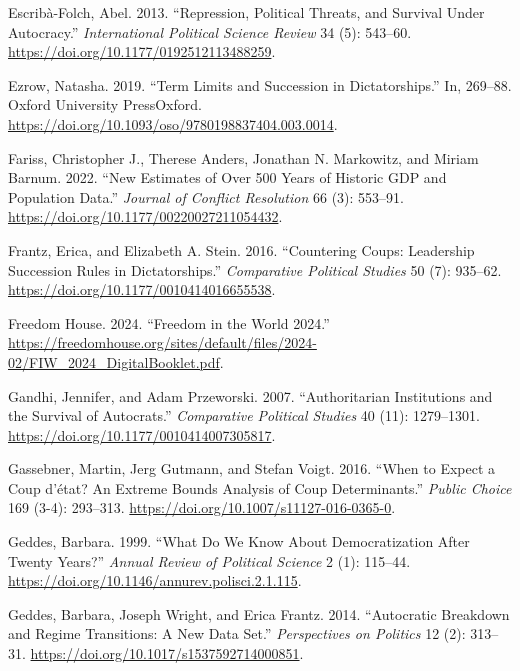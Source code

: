 \documentclass[
  12pt,
]{report}
\newlength{\cslhangindent}
\newenvironment{CSLReferences}[2] %
 {\begin{list}{}{%
  \setlength{\itemindent}{0pt}
  \setlength{\leftmargin}{0pt}
  \setlength{\parsep}{0pt}
  \ifodd #1
   \setlength{\leftmargin}{\cslhangindent}
   \setlength{\itemindent}{-1\cslhangindent}
  \fi
  \setlength{\itemsep}{#2\baselineskip}}}
 {\end{list}}
\begin{document}
\begin{CSLReferences}{1}{0}
Escribà-Folch, Abel. 2013. {``Repression, Political Threats, and
Survival Under Autocracy.''} \emph{International Political Science
Review} 34 (5): 543--60. \url{https://doi.org/10.1177/0192512113488259}.

Ezrow, Natasha. 2019. {``Term Limits and Succession in Dictatorships.''}
In, 269--88. Oxford University PressOxford.
\url{https://doi.org/10.1093/oso/9780198837404.003.0014}.

Fariss, Christopher J., Therese Anders, Jonathan N. Markowitz, and
Miriam Barnum. 2022. {``New Estimates of Over 500 Years of Historic GDP
and Population Data.''} \emph{Journal of Conflict Resolution} 66 (3):
553--91. \url{https://doi.org/10.1177/00220027211054432}.

Frantz, Erica, and Elizabeth A. Stein. 2016. {``Countering Coups:
Leadership Succession Rules in Dictatorships.''} \emph{Comparative
Political Studies} 50 (7): 935--62.
\url{https://doi.org/10.1177/0010414016655538}.

Freedom House. 2024. {``Freedom in the World 2024.''}
\url{https://freedomhouse.org/sites/default/files/2024-02/FIW_2024_DigitalBooklet.pdf}.

Gandhi, Jennifer, and Adam Przeworski. 2007. {``Authoritarian
Institutions and the Survival of Autocrats.''} \emph{Comparative
Political Studies} 40 (11): 1279--1301.
\url{https://doi.org/10.1177/0010414007305817}.

Gassebner, Martin, Jerg Gutmann, and Stefan Voigt. 2016. {``When to
Expect a Coup d{'}état? An Extreme Bounds Analysis of Coup
Determinants.''} \emph{Public Choice} 169 (3-4): 293--313.
\url{https://doi.org/10.1007/s11127-016-0365-0}.

Geddes, Barbara. 1999. {``What Do We Know About Democratization After
Twenty Years?''} \emph{Annual Review of Political Science} 2 (1):
115--44. \url{https://doi.org/10.1146/annurev.polisci.2.1.115}.

Geddes, Barbara, Joseph Wright, and Erica Frantz. 2014. {``Autocratic
Breakdown and Regime Transitions: A New Data Set.''} \emph{Perspectives
on Politics} 12 (2): 313--31.
\url{https://doi.org/10.1017/s1537592714000851}.


\end{CSLReferences}
\end{document}
